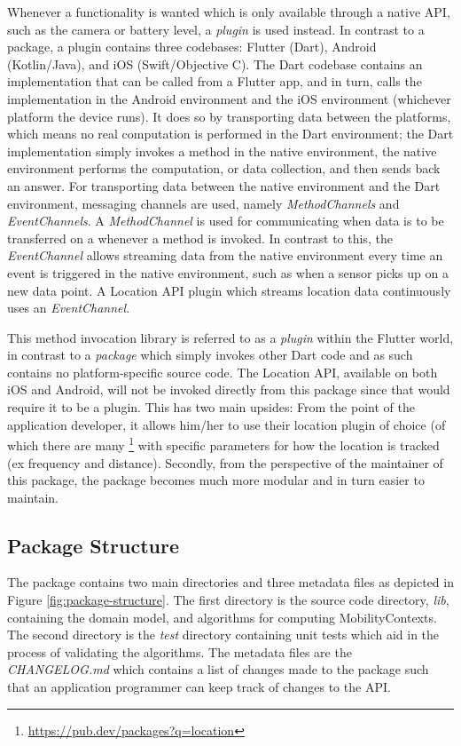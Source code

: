 Whenever a functionality is wanted which is only available through a native API, such as the camera or battery level, a \textit{plugin} is used instead. In contrast to a package, a plugin contains three codebases: Flutter (Dart), Android (Kotlin/Java), and iOS (Swift/Objective C). The Dart codebase contains an implementation that can be called from a Flutter app, and in turn, calls the implementation in the Android environment and the iOS environment (whichever platform the device runs). It does so by transporting data between the platforms, which means no real computation is performed in the Dart environment; the Dart implementation simply invokes a method in the native environment, the native environment performs the computation, or data collection, and then sends back an answer. For transporting data between the native environment and the Dart environment, messaging channels are used, namely \textit{MethodChannels} and \textit{EventChannels}. A \textit{MethodChannel} is used for communicating when data is to be transferred on a whenever a method is invoked. In contrast to this, the \textit{EventChannel} allows streaming data from the native environment every time an event is triggered in the native environment, such as when a sensor picks up on a new data point. A Location API plugin which streams location data continuously uses an \textit{EventChannel}.

This method invocation library is referred to as a \textit{plugin} within the Flutter world, in contrast to a \textit{package} which simply invokes other Dart code and as such contains no platform-specific source code.  The Location API, available on both iOS and Android, will not be invoked directly from this package since that would require it to be a plugin. This has two main upsides: From the point of the application developer, it allows him/her to use their location plugin of choice (of which there are many \footnote{\url{https://pub.dev/packages?q=location}} with specific parameters for how the location is tracked (ex frequency and distance). Secondly, from the perspective of the maintainer of this package, the package becomes much more modular and in turn easier to maintain.

\subsection{Package Structure}
The package contains two main directories and three metadata files as depicted in Figure \ref{fig:package-structure}. The first directory is the source code directory, \textit{lib}, containing the domain model, and algorithms for computing MobilityContexts. The second directory is the \textit{test} directory containing unit tests which aid in the process of validating the algorithms. The metadata files are the \textit{CHANGELOG.md} which contains a list of changes made to the package such that an application programmer can keep track of changes to the API. 

